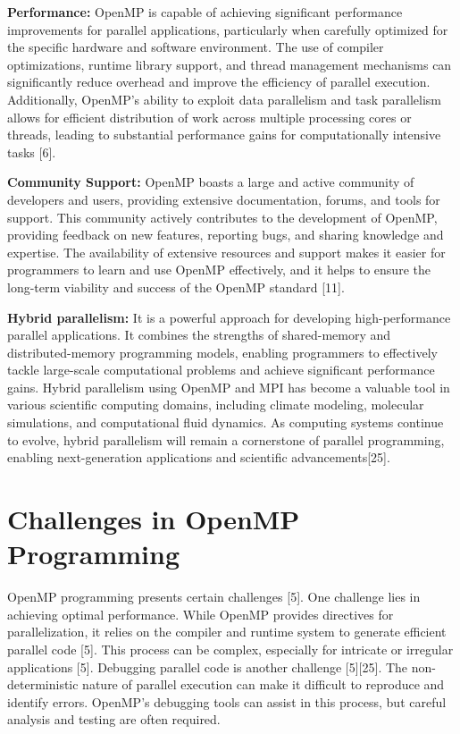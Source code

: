 \documentclass[12pt,conference]{IEEEtran}
\begin{document}
\textbf{Performance: }OpenMP is capable of achieving significant performance improvements for parallel applications, particularly when carefully optimized for the specific hardware and software environment. The use of compiler optimizations, runtime library support, and thread management mechanisms can significantly reduce overhead and improve the efficiency of parallel execution. Additionally, OpenMP's ability to exploit data parallelism and task parallelism allows for efficient distribution of work across multiple processing cores or threads, leading to substantial performance gains for computationally intensive tasks [6]. 

\textbf{Community Support:} OpenMP boasts a large and active community of developers and users, providing extensive documentation, forums, and tools for support. This community actively contributes to the development of OpenMP, providing feedback on new features, reporting bugs, and sharing knowledge and expertise. The availability of extensive resources and support makes it easier for programmers to learn and use OpenMP effectively, and it helps to ensure the long-term viability and success of the OpenMP standard [11].

\textbf{Hybrid parallelism:} It is a powerful approach for developing high-performance parallel applications. It combines the strengths of shared-memory and distributed-memory programming models, enabling programmers to effectively tackle large-scale computational problems and achieve significant performance gains. Hybrid parallelism using OpenMP and MPI has become a valuable tool in various scientific computing domains, including climate modeling, molecular simulations, and computational fluid dynamics. As computing systems continue to evolve, hybrid parallelism will remain a cornerstone of parallel programming, enabling next-generation applications and scientific advancements[25].


\section{Challenges in OpenMP Programming}
OpenMP programming presents certain challenges [5]. One challenge lies in achieving optimal performance. While OpenMP provides directives for parallelization, it relies on the compiler and runtime system to generate efficient parallel code [5]. This process can be complex, especially for intricate or irregular applications [5]. Debugging parallel code is another challenge [5][25]. The non-deterministic nature of parallel execution can make it difficult to reproduce and identify errors. OpenMP's debugging tools can assist in this process, but careful analysis and testing are often required.
\end{document}
